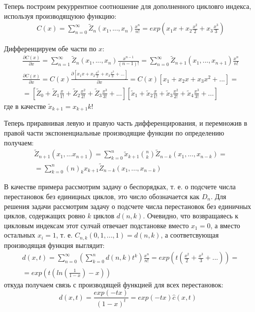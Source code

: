 Теперь построим рекуррентное соотношение для дополненного цикловго индекса, используя производящуюю функцию:
\[
	\begin{split}
		& C\left(x\right) = \sum_{n=0}^{\infty} \tilde Z_n\left(x_1, ..., x_n\right) \frac{x^n}{n!} = exp\left(x_1x + x_2 \frac{x^2}{2} + x_3 \frac{x^3}{3}\right)
	\end{split}
\]

Дифференцируем обе части по $x$:
\[
	\begin{split}
		&\frac{\partial C\left(x\right)}{\partial x} = \sum_{n=1}^{\infty} \tilde Z_n \left(x_1, ..., x_n\right) \frac{x^{n-1}}{\left(n-1\right)!} = \sum_{n=0}^{\infty} \tilde Z_{n+1} \left(x_1, ..., x_{n+1}\right) \frac{x^n}{n!}\\
		&\frac{\partial C\left(x\right)}{\partial x} = C\left(x\right)\frac{\partial \left[x_1x + x_2\frac{x^2}{2} + x_3 \frac{x^3}{3} + ...\right]}{\partial x} = C\left(x\right) \left[x_1 + x_2 x + x_3 x^2 + ...\right] = \\
		& = \left[\tilde Z_0 + \tilde Z_1 \frac{x}{1!} + \tilde Z_2 \frac{x^2}{2!} + \tilde Z_3 \frac{x^3}{3!} + ...\right]\left[\tilde x_1 + \tilde x_2 \frac{x}{1!} + \tilde x_3 \frac{x^2}{2!} + \tilde x_4 \frac{x^3}{3!} + ...\right]
	\end{split}
\]
где в качестве $\tilde x_{k+1} = x_{k+1} k!$

Теперь приравнивая левую и правую часть дифференцирования, и перемножив в правой части экспоненциальные производящие функции по определению получаем:
\[
	\begin{split}
		&\tilde Z_{n+1} \left(x_1, ... x_{n+1}\right) = \sum_{k=0}^n \tilde x_{k+1} \binom{n}{k} \tilde Z_{n-k}\left(x_1, ..., x_{n-k}\right) =\\
		&= \sum_{k=0}^n \left(n\right)_k x_{k+1} \tilde Z_{n-k} \left(x_1, ..., x_{n-k}\right)
	\end{split}
\]

В качестве примера рассмотрим задачу о беспорядках, т. е. о подсчете числа перестановок без единицных циклов, это число обозначается как $D_n$. Для решения задачи рассмотрим задачу о подсчете числа перестановок без единичных циклов, содержащих ровно $k$ циклов $d\left(n,k\right)$. Очевидно, что возвращаяесь к цикловым индексам этот сулчай отвечает подстановке вместо $x_1 = 0$, а вместо остальных $x_i = 1$, т. е. $C_{n,k}\left(0,1,...,1\right) = d\left(n,k\right)$, а соответсвующая производящая функция выглядит:
\[
	\begin{split}
		&d\left(x,t\right) = \sum_{n=0}^{\infty}\left(\sum_{k=0}^n d\left(n,k\right)t^k\right)\frac{x^n}{n!} = exp\left(t\left(\frac{x^2}{2} + \frac{x^3}{3} + ...\right)\right) = \\
		& = exp\left(t\left(ln\left(\frac{1}{1-x}\right) - x\right)\right)
	\end{split}
\]
откуда получаем связь с производящей функцией для всех перестановок:
\[
	d\left(x,t\right) = \frac{exp\left(-tx\right)}{\left(1-x\right)^t} = exp\left(-tx\right)\hat c\left(x,t\right)
\]

